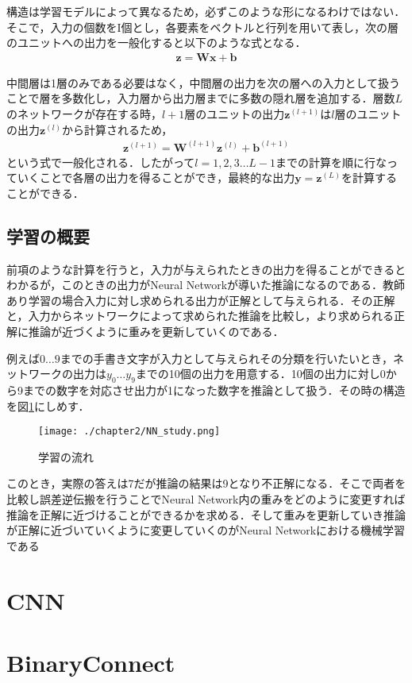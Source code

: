 構造は学習モデルによって異なるため，必ずこのような形になるわけではない．そこで，入力の個数をI個とし，各要素をベクトルと行列を用いて表し，次の層のユニットへの出力を一般化すると以下のような式となる．
\begin{align*}
\bm{z} = \bm{W}\bm{x} + \bm{b}
\end{align*}

中間層は1層のみである必要はなく，中間層の出力を次の層への入力として扱うことで層を多数化し，入力層から出力層までに多数の隠れ層を追加する．層数$L$のネットワークが存在する時，$l+1$層のユニットの出力$\bm{z}^{(l+1)}$は$l$層のユニットの出力$\bm{z}^{(l)}$から計算されるため，
\begin{align*}
\bm{z}^{(l+1)} = \bm{W}^{(l+1)}\bm{z}^{(l)} + \bm{b}^{(l+1)}
\end{align*}
という式で一般化される．したがって$l=1,2,3\ldots L-1$までの計算を順に行なっていくことで各層の出力を得ることができ，最終的な出力$\bm{y}=\bm{z}^{(L)}$を計算することができる．

\subsection{学習の概要}
前項のような計算を行うと，入力が与えられたときの出力を得ることができるとわかるが，このときの出力がNeural Networkが導いた推論になるのである．教師あり学習の場合入力に対し求められる出力が正解として与えられる．その正解と，入力からネットワークによって求められた推論を比較し，より求められる正解に推論が近づくように重みを更新していくのである．

例えば$0 \ldots 9$までの手書き文字が入力として与えられその分類を行いたいとき，ネットワークの出力は$y_0 \ldots y_9$までの10個の出力を用意する．10個の出力に対し0から9までの数字を対応させ出力が1になった数字を推論として扱う．その時の構造を図\ref{fig_study}にしめす．
\begin{figure}[]
  \begin{center}
    \texttt{[image: ./chapter2/NN\_study.png]}
    \caption{学習の流れ}
    \label{fig_study}
  \end{center}
\end{figure}
このとき，実際の答えは7だが推論の結果は9となり不正解になる．そこで両者を比較し誤差逆伝搬を行うことでNeural Network内の重みをどのように変更すれば推論を正解に近づけることができるかを求める．そして重みを更新していき推論が正解に近づいていくように変更していくのがNeural Networkにおける機械学習である

\section{CNN}

\section{BinaryConnect}

